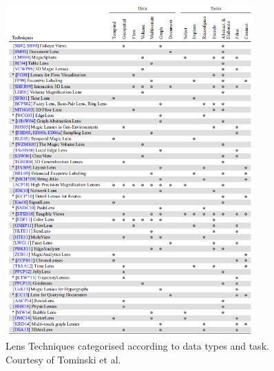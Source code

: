 \begin{figure}[p]
\begin{center}
\includegraphics[width=0.85\textwidth]{images/tominski2014surveyFull}
\caption{Lens Techniques categorised according to data types and task. Courtesy of Tominski et al.\ \cite{tominski2016interactive}}\label{fig: tominski2014survey}
\end{center}
\end{figure}\vspace{-0.2cm}


